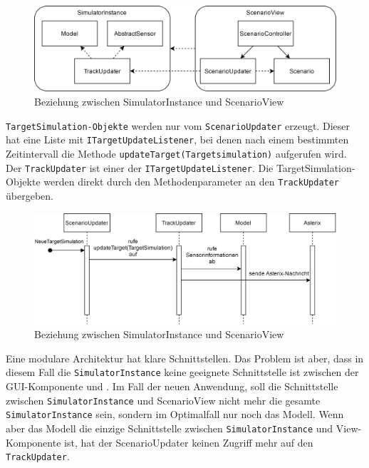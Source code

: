 \begin{figure}[ht]
    \centering
    \includegraphics[width=1\textwidth]{content/assets/Kapitel3/ScenarioViewRelations.png}
    \caption{Beziehung zwischen SimulatorInstance und ScenarioView}
    \label{figure:scenarioview}
\end{figure}

\texttt{TargetSimulation-Objekte} werden nur vom \texttt{ScenarioUpdater} erzeugt. Dieser hat eine Liste mit \texttt{ITargetUpdateListener}, bei denen nach einem bestimmten Zeitintervall die Methode \texttt{updateTarget(Targetsimulation)} aufgerufen wird. Der \texttt{TrackUpdater} ist einer der \texttt{ITargetUpdateListener}. Die TargetSimulation-Objekte werden direkt durch den Methodenparameter an den \texttt{TrackUpdater} übergeben.

\begin{figure}[ht]
    \centering
    \includegraphics[width=1\textwidth]{content/assets/Kapitel3/TargetSimulationUsecase.png}
    \caption{Beziehung zwischen SimulatorInstance und ScenarioView}
    \label{figure:x}
\end{figure}

Eine modulare Architektur hat klare Schnittstellen. Das Problem ist aber, dass in diesem Fall die \texttt{SimulatorInstance} keine geeignete Schnittstelle ist zwischen der GUI-Komponente und . Im Fall der neuen Anwendung, soll die Schnittstelle zwischen \texttt{SimulatorInstance} und ScenarioView nicht mehr die gesamte \texttt{SimulatorInstance} sein, sondern im Optimalfall nur noch das Modell. Wenn aber das Modell die einzige Schnittstelle zwischen \texttt{SimulatorInstance} und View-Komponente ist, hat der ScenarioUpdater keinen Zugriff mehr auf den \texttt{TrackUpdater}.

